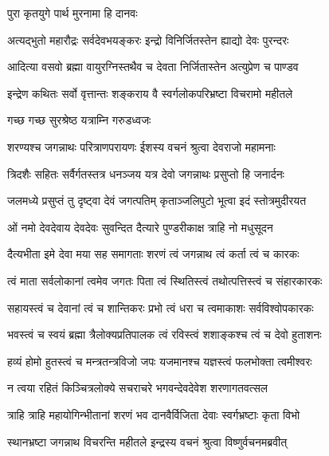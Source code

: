 
\onelineshloka
{पुरा कृतयुगे पार्थ मुरनामा हि दानवः} %

\twolineshloka
{अत्यद्भुतो महारौद्रः सर्वदेवभयङ्करः}
{इन्द्रो विनिर्जितस्तेन ह्याद्यो देवः पुरन्दरः} %

\twolineshloka
{आदित्या वसवो ब्रह्मा वायुरग्निस्तथैव च}
{देवता निर्जितास्तेन अत्युप्रेण च पाण्डव} %

\twolineshloka
{इन्द्रेण कथितः सर्वो वृत्तान्तः शङ्कराय वै}
{स्वर्गलोकपरिभ्रष्टा विचरामो महीतले} %



\onelineshloka
{गच्छ गच्छ सुरश्रेष्ठ यत्राम्नि गरुडध्वजः} %

\twolineshloka
{शरण्यश्च जगन्नाथः परित्राणपरायणः}
{ईशस्य वचनं श्रुत्वा देवराजो महामनाः} %

\twolineshloka
{त्रिदशैः सहितः सर्वैर्गतस्तत्र धनञ्जय}
{यत्र देवो जगन्नाथः प्रसुप्तो हि जनार्दनः} %

\twolineshloka
{जलमध्ये प्रसुप्तं तु दृष्ट्वा देवं जगत्पतिम्}
{कृताञ्जलिपुटो भूत्वा इदं स्तोत्रमुदीरयत} %

\twolineshloka
{ओं नमो देवदेवाय देवदेवः सुवन्दित}
{दैत्यारे पुण्डरीकाक्ष त्राहि नो मधुसूदन} %

\twolineshloka
{दैत्यभीता इमे देवा मया सह समागताः}
{शरणं त्वं जगन्नाथ त्वं कर्ता त्वं च कारकः} %

\twolineshloka
{त्वं माता सर्वलोकानां त्वमेव जगतः पिता}
{त्वं स्थितिस्त्वं तथोत्पत्तिस्त्वं च संहारकारकः} %

\twolineshloka
{सहायस्त्वं च देवानां त्वं च शान्तिकरः प्रभो}
{त्वं धरा च त्वमाकाशः सर्वविश्वोपकारकः} %

\twolineshloka
{भवस्त्वं च स्वयं ब्रह्मा त्रैलोक्यप्रतिपालक}
{त्वं रविस्त्वं शशाङ्कश्च त्वं च देवो हुताशनः} %

\twolineshloka
{हव्यं होमो हुतस्त्वं च मन्त्रतन्त्रविजो जपः}
{यजमानश्च यज्ञस्त्वं फलभोक्ता त्वमीश्वरः} %

\twolineshloka
{न त्वया रहितं किञ्चित्रलोक्ये सचराचरे}
{भगवन्देवदेवेश शरणागतवत्सल} %

\twolineshloka
{त्राहि त्राहि महायोगिन्भीतानां शरणं भव}
{दानवैर्विजिता देवाः स्वर्गभ्रष्टाः कृता विभो} %

\twolineshloka
{स्थानभ्रष्टा जगन्नाथ विचरन्ति महीतले}
{इन्द्रस्य वचनं श्रुत्वा विष्णुर्वचनमब्रवीत्} %

